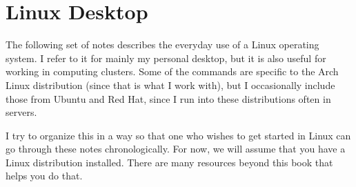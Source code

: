 \section{Linux Desktop} 

  The following set of notes describes the everyday use of a Linux operating system. I refer to it for mainly my personal desktop, but it is also useful for working in computing clusters. Some of the commands are specific to the Arch Linux distribution (since that is what I work with), but I occasionally include those from Ubuntu and Red Hat, since I run into these distributions often in servers. 

  I try to organize this in a way so that one who wishes to get started in Linux can go through these notes chronologically. For now, we will assume that you have a Linux distribution installed. There are many resources beyond this book that helps you do that. 

